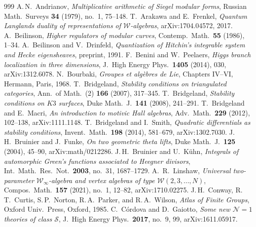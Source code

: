 \begin{thebibliography}{999}
 A.\,N.~Andrianov, \emph{Multiplicative arithmetic of Siegel modular forms}, Russian Math.\ Surveys \textbf{34} (1979), no.~1, 75--148.
 T.~Arakawa and E.~Frenkel, \emph{Quantum Langlands duality of representations of $\mathcal{W}$-algebras}, arXiv:1704.04572, 2017.
 A.~Beilinson, \emph{Higher regulators of modular curves}, Contemp.\ Math.\ \textbf{55} (1986), 1--34.
 A.~Beilinson and V.~Drinfeld, \emph{Quantization of Hitchin's integrable system and Hecke eigensheaves}, preprint, 1991.
 F.~Benini and W.~Peelaers, \emph{Higgs branch localization in three dimensions}, J.~High Energy Phys.\ \textbf{1405} (2014), 030, arXiv:1312.6078.
 N.~Bourbaki, \emph{Groupes et alg\`ebres de Lie}, Chapters IV--VI, Hermann, Paris, 1968.
 T.~Bridgeland, \emph{Stability conditions on triangulated categories}, Ann.\ of Math.\ (2) \textbf{166} (2007), 317--345.
 T.~Bridgeland, \emph{Stability conditions on $K3$ surfaces}, Duke Math.\ J.\ \textbf{141} (2008), 241--291.
 T.~Bridgeland and E.~Macri, \emph{An introduction to motivic Hall algebras}, Adv.\ Math.\ \textbf{229} (2012), 102--138, arXiv:1111.1148.
 T.~Bridgeland and I.~Smith, \emph{Quadratic differentials as stability conditions}, Invent.\ Math.\ \textbf{198} (2014), 581--679, arXiv:1302.7030.
 J.\,H.~Bruinier and J.~Funke, \emph{On two geometric theta lifts}, Duke Math.\ J.\ \textbf{125} (2004), 45--90, arXiv:math/0212286.
 J.\,H.~Bruinier and U.~K\"uhn, \emph{Integrals of automorphic Green's functions associated to Heegner divisors}, Int.\ Math.\ Res.\ Not.\ \textbf{2003}, no.~31, 1687--1729.
A.~R.~Linshaw, \emph{Universal two-parameter $\mathcal{W}_\infty$-algebra and vertex algebras of type $\mathcal{W}(2,3,\ldots,N)$}, Compos.\ Math.\ \textbf{157} (2021), no.~1, 12--82, arXiv:1710.02275.
 J.\,H.~Conway, R.\,T.~Curtis, S.\,P.~Norton, R.\,A.~Parker, and R.\,A.~Wilson, \emph{Atlas of Finite Groups}, Oxford Univ.\ Press, Oxford, 1985.
 C.~C\'ordova and D.~Gaiotto, \emph{Some new $\mathcal N=1$ theories of class $\mathcal S$}, J.~High Energy Phys.\ \textbf{2017}, no.~9, 99, arXiv:1611.05917.

\end{thebibliography}
